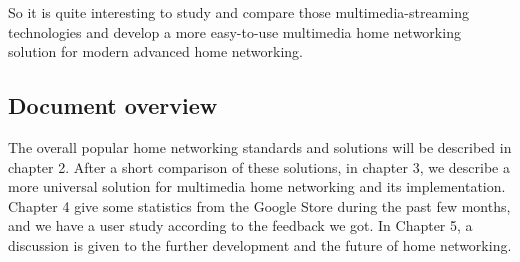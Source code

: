 So it is quite interesting to study and compare those multimedia-streaming technologies and 
develop a more easy-to-use multimedia home networking solution for modern advanced home 
networking.

\subsection{Document overview}
The overall popular home networking standards and solutions will be described in
chapter 2. After a short comparison of these solutions, in chapter 3, we
describe a more universal solution for multimedia home networking and its
implementation. Chapter 4 give some statistics from the Google Store
during the past few months, and we have a user study according to the feedback
we got. In Chapter 5, a discussion is given to the further development and the
future of home networking.
